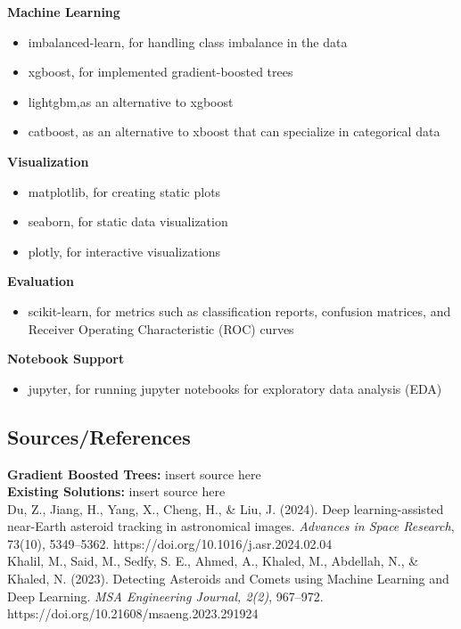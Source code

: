 \documentclass{article}
\begin{document}
\textbf{Machine Learning}
\begin{itemize}
    \item imbalanced-learn, for handling class imbalance in the data
    \item xgboost, for implemented gradient-boosted trees
    \item lightgbm,as an alternative to xgboost
    \item catboost, as an alternative to xboost that can specialize in categorical data
\end{itemize}

\textbf{Visualization}
\begin{itemize}
    \item matplotlib, for creating static plots
    \item seaborn, for static data visualization
    \item plotly, for interactive visualizations
\end{itemize}

\textbf{Evaluation}
\begin{itemize}
    \item scikit-learn, for metrics such as classification reports, confusion matrices, and Receiver Operating Characteristic (ROC) curves
\end{itemize}

\textbf{Notebook Support}
\begin{itemize}
    \item jupyter, for running jupyter notebooks for exploratory data analysis (EDA)
\end{itemize}

\subsection*{Sources/References}
\textbf{Gradient Boosted Trees:} insert source here\\

\textbf{Existing Solutions:} insert source here\\

Du, Z., Jiang, H., Yang, X., Cheng, H., \& Liu, J. (2024). Deep learning-assisted near-Earth asteroid tracking in astronomical images. \textit{Advances in Space Research}, 73(10), 5349–5362. https://doi.org/10.1016/j.asr.2024.02.04\\

Khalil, M., Said, M., Sedfy, S. E., Ahmed, A., Khaled, M., Abdellah, N., \& Khaled, N. (2023). Detecting Asteroids and Comets using Machine Learning and Deep Learning. \textit{MSA Engineering Journal, 2(2)}, 967–972. \\ https://doi.org/10.21608/msaeng.2023.291924\\
\end{document}
